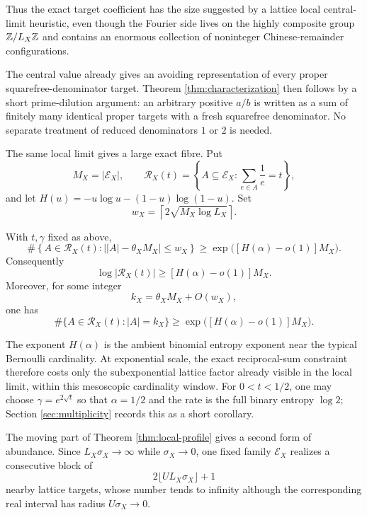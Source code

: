 Thus the exact target coefficient has the size suggested by a lattice local central-limit heuristic, even though the Fourier side lives on the highly composite group $\mathbb Z/L_X\mathbb Z$ and contains an enormous collection of noninteger Chinese-remainder configurations.

The central value already gives an avoiding representation of every proper squarefree-denominator target. Theorem \ref{thm:characterization} then follows by a short prime-dilution argument: an arbitrary positive $a/b$ is written as a sum of finitely many identical proper targets with a fresh squarefree denominator. No separate treatment of reduced denominators $1$ or $2$ is needed.

The same local limit gives a large exact fibre. Put
\[
M_X=|\mathcal E_X|,
\qquad
\mathcal R_X(t)
=
\left\{A\subseteq\mathcal E_X:
\sum_{e\in A}\frac1e=t\right\},
\tag{1.10}\label{eq:1.10}
\]
and let $H(u)=-u\log u-(1-u)\log(1-u)$. Set
\[
w_X=\left\lceil2\sqrt{M_X\log L_X}\right\rceil.
\tag{1.11}\label{eq:1.11}
\]

\begin{theorem}\label{thm:multiplicity}
With $t,\gamma$ fixed as above,
\[
\#\left\{A\in\mathcal R_X(t):
\bigl||A|-\theta_XM_X\bigr|\le w_X\right\}
\ge
\exp\bigl([H(\alpha)-o(1)]M_X\bigr).
\tag{1.12}\label{eq:1.12}
\]
Consequently
\[
\log|\mathcal R_X(t)|
\ge
[H(\alpha)-o(1)]M_X.
\tag{1.13}\label{eq:1.13}
\]
Moreover, for some integer
\[
k_X=\theta_XM_X+O(w_X),
\]
one has
\[
\#\{A\in\mathcal R_X(t):|A|=k_X\}
\ge
\exp\bigl([H(\alpha)-o(1)]M_X\bigr).
\tag{1.14}\label{eq:1.14}
\]
\end{theorem}

The exponent $H(\alpha)$ is the ambient binomial entropy exponent near the typical Bernoulli cardinality. At exponential scale, the exact reciprocal-sum constraint therefore costs only the subexponential lattice factor already visible in the local limit, within this mesoscopic cardinality window. For $0<t<1/2$, one may choose $\gamma=e^{2\sqrt t}$ so that $\alpha=1/2$ and the rate is the full binary entropy $\log2$; Section \ref{sec:multiplicity} records this as a short corollary.

The moving part of Theorem \ref{thm:local-profile} gives a second form of abundance. Since $L_X\sigma_X\to\infty$ while $\sigma_X\to0$, one fixed family $\mathcal E_X$ realizes a consecutive block of
\[
2\lfloor U L_X\sigma_X\rfloor+1
\]
nearby lattice targets, whose number tends to infinity although the corresponding real interval has radius $U\sigma_X\to0$.

